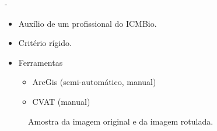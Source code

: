\documentclass[%
  10pt,%
  aspectratio = 169,%
  compress,%
  t,%
  english,%
  brazilian,%
  tikz,
]{beamer}
\begin{document}
\begin{frame}
\color{gray}{Seleção} - 

\begin{itemize}
    \item Auxílio de um profissional do ICMBio.
    \item Critério rígido.
    \item Ferramentas
    \begin{itemize}
        \item ArcGis (semi-automático, manual)
        \item CVAT (manual)
    \end{itemize}
\end{itemize}

\begin{figure}[!htb]
\centering%
\caption{Amostra da imagem original e da imagem rotulada.}%
\label{fig:labeled}
\end{figure}

\end{frame}
\end{document}
